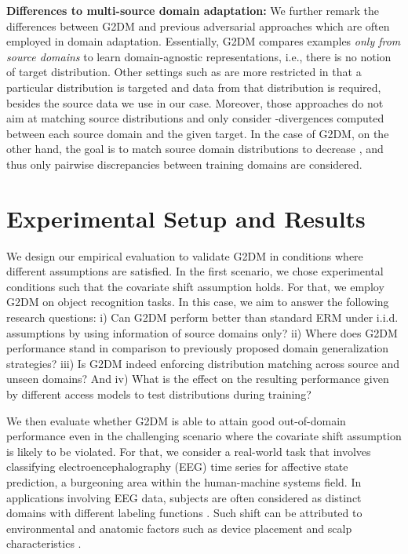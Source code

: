 \documentclass{article}
\begin{document}
\textbf{Differences to multi-source domain adaptation:} We further remark the differences between G2DM and previous adversarial approaches which are often employed in domain adaptation. Essentially, G2DM compares examples \emph{only from source domains} to learn domain-agnostic representations, i.e., there is no notion of target distribution. Other settings such as \cite{sun2015survey, peng2019moment} are more restricted in that a particular distribution is targeted and data from that distribution is required, besides the source data we use in our case. Moreover, those approaches do not aim at matching source distributions and only consider -divergences computed between each source domain and the given target. In the case of G2DM, on the other hand, the goal is to match source domain distributions to decrease , and thus only pairwise discrepancies between training domains are considered.

\section{Experimental Setup and Results}\label{sec:res}


We design our empirical evaluation to validate G2DM in conditions where different assumptions are satisfied. In the first scenario, we chose experimental conditions such that the covariate shift assumption holds. For that, we employ G2DM on object recognition tasks. In this case, we aim to answer the following research questions: i) Can G2DM perform better than standard ERM under i.i.d. assumptions by using information of source domains only? ii) Where does G2DM performance stand in comparison to previously proposed domain generalization strategies? iii) Is G2DM indeed enforcing distribution matching across source and unseen domains? And iv) What is the effect on the resulting performance given by different access models to test distributions during training?

We then evaluate whether G2DM is able to attain good out-of-domain performance even in the challenging scenario where the covariate shift assumption is likely to be violated. For that, we consider a real-world task that involves classifying electroencephalography (EEG) time series for affective state prediction, a burgeoning area within the human-machine systems field. In applications involving EEG data, subjects are often considered as distinct domains with different labeling functions \cite{albuquerque2019cross}. Such shift can be attributed to environmental and anatomic factors such as device placement and scalp characteristics \cite{wu2015reducing, wei2018subject}. 
\end{document}
